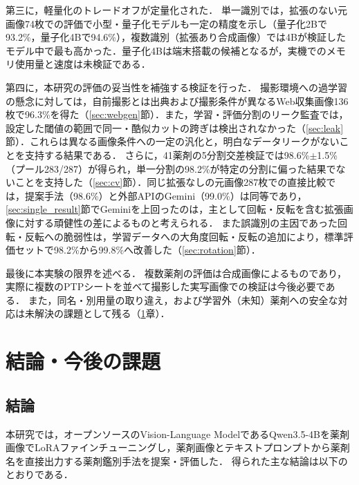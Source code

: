 \documentclass[dvipdfmx]{jsarticle}
\begin{document}
第三に，軽量化のトレードオフが定量化された．
単一識別では，拡張のない元画像74枚での評価で小型・量子化モデルも一定の精度を示し（量子化2Bで93.2\%，量子化4Bで94.6\%），複数識別（拡張あり合成画像）では4Bが検証したモデル中で最も高かった．量子化4Bは端末搭載の候補となるが，実機でのメモリ使用量と速度は未検証である．

第四に，本研究の評価の妥当性を補強する検証を行った．
撮影環境への過学習の懸念に対しては，自前撮影とは出典および撮影条件が異なるWeb収集画像136枚で96.3\%を得た（\ref{sec:webgen}節）．また，学習・評価分割のリーク監査では，設定した閾値の範囲で同一・酷似カットの跨ぎは検出されなかった（\ref{sec:leak}節）．これらは異なる画像条件への一定の汎化と，明白なデータリークがないことを支持する結果である．
さらに，41薬剤の5分割交差検証では98.6\%$\pm$1.5\%（プール283/287）が得られ，単一分割の98.2\%が特定の分割に偏った結果でないことを支持した（\ref{sec:cv}節）．同じ拡張なしの元画像287枚での直接比較では，提案手法（98.6\%）と外部APIのGemini（99.0\%）は同等であり，\ref{sec:single_result}節でGeminiを上回ったのは，主として回転・反転を含む拡張画像に対する頑健性の差によるものと考えられる．
また誤識別の主因であった回転・反転への脆弱性は，学習データへの大角度回転・反転の追加により，標準評価セットで98.2\%から99.8\%へ改善した（\ref{sec:rotation}節）．

最後に本実験の限界を述べる．
複数薬剤の評価は合成画像によるものであり，実際に複数のPTPシートを並べて撮影した実写画像での検証は今後必要である．
また，同名・別用量の取り違え，および学習外（未知）薬剤への安全な対応は未解決の課題として残る（\ref{sec5}章）．

\newpage

\section{結論・今後の課題}\label{sec5}

\subsection{結論}

本研究では，オープンソースのVision-Language ModelであるQwen3.5-4Bを薬剤画像でLoRAファインチューニングし，薬剤画像とテキストプロンプトから薬剤名を直接出力する薬剤鑑別手法を提案・評価した．
得られた主な結論は以下のとおりである．
\end{document}
